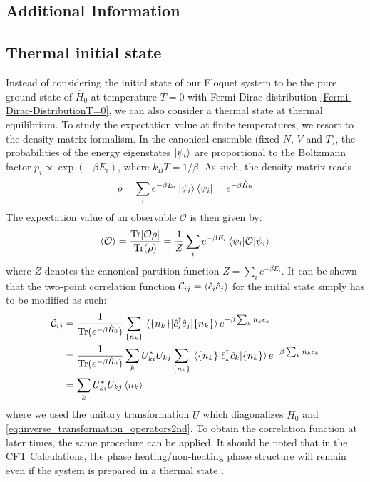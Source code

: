\documentclass[11pt, a4paper, oneside]{book}
\theoremstyle{definition} %
\begin{document}
\printbibliography[heading=bibintoc,title={Bibliography}]
\newpage


\begin{appendices}
\appendix
\appendixpage
\addappheadtotoc
\chapter{Additional Information}
\section{Thermal initial state}
Instead of considering the initial state of our Floquet system to be the pure ground state of $\hat{H}_0$ at temperature $T=0$ with Fermi-Dirac distribution \ref{Fermi-Dirac-DistributionT=0}, we can also consider a thermal state at thermal equilibrium. To study the expectation value at finite temperatures, we resort to the density matrix formalism. In the canonical ensemble (fixed $N$, $V$ and $T$), the probabilities of the energy eigenstates $\ket{\psi_i}$ are proportional to the Boltzmann factor $p_i \propto \exp(-\beta E_i)$, where $k_BT = 1/\beta$. As such, the density matrix reads
\begin{equation}
	\rho = \sum_{i} e^{-\beta E_i} \ket{\psi_i} \bra{\psi_i} = e^{-\beta \hat{H}_0}
\end{equation}
The expectation value of an observable $\mathcal{O}$ is then given by:
\begin{equation}
	\expval{\mathcal{O}} = \frac{\text{Tr}[\mathcal{O}\rho]}{\text{Tr}(\rho)} = \frac{1}{Z} \sum_i e^{-\beta E_i} \mel{\psi_i}{\mathcal{O}}{\psi_i}
\end{equation}
where $Z$ denotes the canonical partition function $Z = \sum_i e^{-\beta E_i}$. It can be shown that the two-point correlation function $\mathcal{C}_{ij} = \expval{\hat{c}_i \hat{c}_j}$ for the initial state simply has to be modified as such:
\begin{align}
		\mathcal{C}_{ij} &= \frac{1}{\text{Tr}(e^{-\beta \hat{H}_0})} \sum_{\{n_k\}}\mel{\{n_k\}}{\hat{c}_i^\dagger \hat{c}_j}{\{n_k\}} e^{-\beta \sum_k n_k \epsilon_k} \\
		&= \frac{1}{\text{Tr}(e^{-\beta \hat{H}_0})} \sum_{k} U_{ki}^* U_{kj} \sum_{\{n_k\}} \mel{\{n_k\}}{\hat{c}_k^\dagger \hat{c}_k}{\{n_k\}}e^{-\beta \sum_k n_k \epsilon_k} \\
		& = \sum_k U_{ki}^* U_{kj} \expval{n_k}
\end{align}
where we used the unitary transformation $U$ which diagonalizes $\hat{H}_0$ and \ref{eq:inverse_transformation_operators2nd}. To obtain the correlation function at later times, the same procedure can be applied. It should be noted that in the CFT Calculations, the phase heating/non-heating phase structure will remain even if the system is prepared in a thermal state \cite{Fan}.



\end{appendices}
\end{document}
